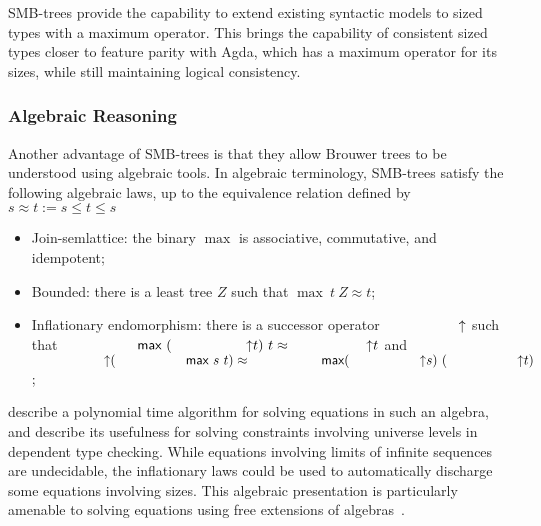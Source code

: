 SMB-trees provide the capability to extend existing syntactic models to sized types
with a maximum operator.
This brings the capability of consistent sized types closer to feature parity with Agda,
which has a maximum operator for its sizes,
while still maintaining logical consistency.

\subsubsection{Algebraic Reasoning}
Another advantage of SMB-trees is that they allow Brouwer trees to
be understood using algebraic tools.
In algebraic terminology, SMB-trees satisfy the following algebraic laws, up to the equivalence relation defined by $s \approx t := s \le t \le s $
\begin{itemize}
  \item Join-semlattice: the binary $\max$ is associative, commutative, and idempotent;
  \item Bounded: there is a least tree $Z$ such that $\max\ t\ Z \approx t$;
  \item Inflationary endomorphism: there is a successor operator $\up$
        such that ${\max\ (\up t)\ t \approx \up t}$
        and\\ ${\up (\max\ s\ t) \approx \max (\up s)\ (\up t)}$;
\end{itemize}

 describe a polynomial time algorithm for solving equations in such an algebra,
and describe its usefulness for solving constraints involving universe levels
in dependent type checking. While equations involving limits of infinite sequences
are undecidable, the inflationary laws could be used to automatically discharge some equations involving sizes. This algebraic presentation is particularly
amenable to solving equations using free extensions of algebras~\citep{corbyn:proof-synthesis,allais2023frex}.


